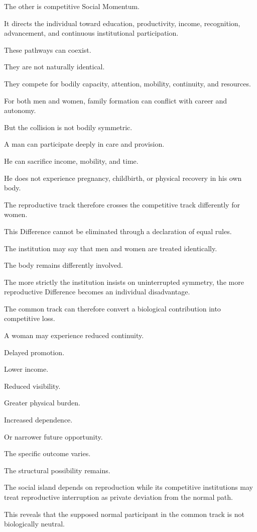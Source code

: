 The other is competitive Social Momentum.

It directs the individual toward education, productivity, income, recognition, advancement, and continuous institutional participation.

These pathways can coexist.

They are not naturally identical.

They compete for bodily capacity, attention, mobility, continuity, and resources.

For both men and women, family formation can conflict with career and autonomy.

But the collision is not bodily symmetric.

A man can participate deeply in care and provision.

He can sacrifice income, mobility, and time.

He does not experience pregnancy, childbirth, or physical recovery in his own body.

The reproductive track therefore crosses the competitive track differently for women.

This Difference cannot be eliminated through a declaration of equal rules.

The institution may say that men and women are treated identically.

The body remains differently involved.

The more strictly the institution insists on uninterrupted symmetry, the more reproductive Difference becomes an individual disadvantage.

The common track can therefore convert a biological contribution into competitive loss.

A woman may experience reduced continuity.

Delayed promotion.

Lower income.

Reduced visibility.

Greater physical burden.

Increased dependence.

Or narrower future opportunity.

The specific outcome varies.

The structural possibility remains.

The social island depends on reproduction while its competitive institutions may treat reproductive interruption as private deviation from the normal path.

This reveals that the supposed normal participant in the common track is not biologically neutral.

